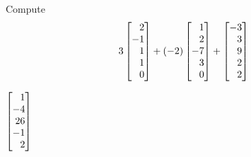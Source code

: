 \begin{exercises}
\begin{problist}
		\prob
		Compute
		\[
			3\mat{2\\-1\\1\\1\\0}+
			(-2)\mat{1\\2\\-7\\3\\0}+
			\mat{-3\\3\\9\\2\\2}
		\]
		\begin{solution}
		    $\mat{1\\-4\\26\\-1\\2}$
		\end{solution}


\end{problist}
\end{exercises}
